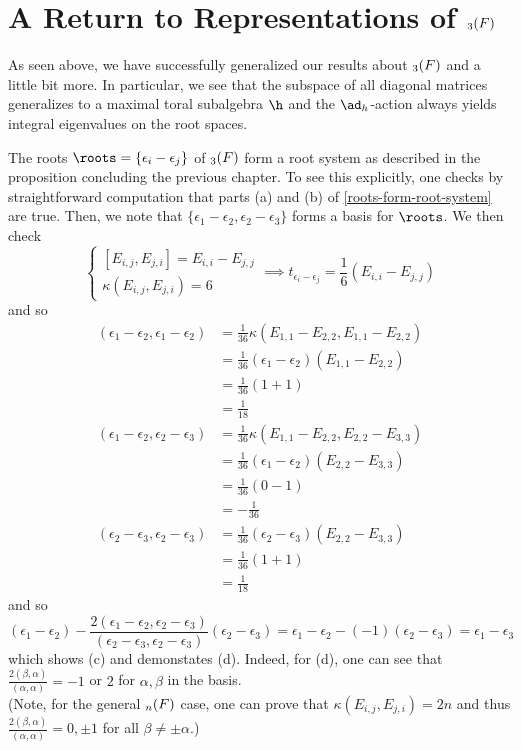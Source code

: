 \documentclass[11pt,leqno,oneside]{amsart}
\numberwithin{thm}{section}
\begin{document}
\section{A Return to Representations of \(\sl_3(F)\)}
As seen above, we have successfully generalized our results about
\(\sl_3(F)\) and a little bit more. In particular, we see that the
subspace of all diagonal matrices generalizes to a maximal toral
subalgebra \(\h\) and the \(\ad_h\)-action always yields integral
eigenvalues on the root spaces.
\begin{example}
  The roots \(\roots = \{\epsilon_i - \epsilon_j\}\) of
  \(\sl_3(F)\) form a root system as described in the proposition
  concluding the previous chapter. To see this explicitly, 
  one checks by straightforward computation that parts (a) and (b) of
  \ref{roots-form-root-system} are true. Then, we note that
  \(\{\epsilon_1-\epsilon_2, \epsilon_2-\epsilon_3\}\) forms a basis
  for \(\roots\). We then check\[
    \begin{cases}
      [E_{i,j},E_{j,i}] = E_{i,i} - E_{j,j} \\
      \kappa(E_{i,j},E_{j,i}) = 6
    \end{cases}
    \implies t_{\epsilon_i-\epsilon_j} = \frac{1}{6}(E_{i,i} - E_{j,j})
  \]
  and so
  \begin{align*}
    (\epsilon_1-\epsilon_2, \epsilon_1-\epsilon_2)
    & = \frac{1}{36}\kappa(E_{1,1}-E_{2,2}, E_{1,1}-E_{2,2}) \\
    & = \frac{1}{36}(\epsilon_1-\epsilon_2)(E_{1,1}-E_{2,2}) \\
    & = \frac{1}{36}(1+1) \\
    & = \frac{1}{18} \\
    (\epsilon_1-\epsilon_2, \epsilon_2-\epsilon_3)
    & = \frac{1}{36}\kappa(E_{1,1}-E_{2,2}, E_{2,2}-E_{3,3}) \\
    & = \frac{1}{36}(\epsilon_1-\epsilon_2)(E_{2,2}-E_{3,3}) \\
    & = \frac{1}{36}(0-1)\\
    & = -\frac{1}{36} \\
    (\epsilon_2-\epsilon_3,\epsilon_2-\epsilon_3)
    & = \frac{1}{36}(\epsilon_2-\epsilon_3)(E_{2,2}-E_{3,3}) \\
    & = \frac{1}{36}(1+1) \\
    & = \frac{1}{18}
  \end{align*}
  and so \[
    (\epsilon_1-\epsilon_2)-\frac{2(\epsilon_1-\epsilon_2,\epsilon_2-\epsilon_3)}{(\epsilon_2-\epsilon_3,\epsilon_2-\epsilon_3)}(\epsilon_2-\epsilon_3)
    = \epsilon_1-\epsilon_2 - (-1)(\epsilon_2-\epsilon_3) =
    \epsilon_1-\epsilon_3 
  \]
  which shows (c) and demonstates (d). Indeed, for (d), one can see
  that \(\frac{2(\beta,\alpha)}{(\alpha,\alpha)} = -1\) or \(2\) for
  \(\alpha,\beta\) in the basis. \\

  (Note, for the general \(\sl_n(F)\) case, one can prove that
  \(\kappa(E_{i,j},E_{j,i}) = 2n\) and thus
  \(\frac{2(\beta,\alpha)}{(\alpha,\alpha)} = 0, \pm 1\) for all \(\beta
  \neq \pm \alpha\).)
\end{example}
\end{document}
